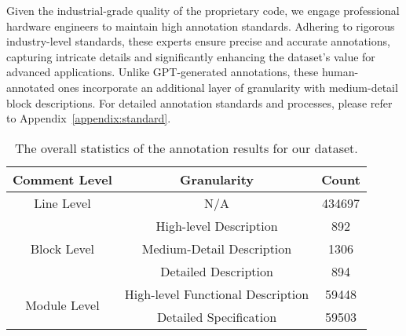 Given the industrial-grade quality of the proprietary code, we engage professional hardware engineers to maintain high annotation standards. Adhering to rigorous industry-level standards, these experts ensure precise and accurate annotations, capturing intricate details and significantly enhancing the dataset's value for advanced applications.
Unlike GPT-generated annotations, these human-annotated ones incorporate an additional layer of granularity with medium-detail block descriptions.
For detailed annotation standards and processes, please refer to Appendix~\ref{appendix:standard}.


\begin{table}[ht]
\centering
\vspace{-10pt}
\caption{The overall statistics of the annotation results for our dataset.}
\vspace{5pt}
\begin{tabular}{|c|c|c|}
\hline
\textbf{Comment Level} & \textbf{Granularity} & \textbf{Count} \\ \hline
Line Level             & N/A                  & 434697 \\ \hline
\multirow{3}{*}{Block Level}  & High-level Description    & 892    \\ \cline{2-3} 
                              & Medium-Detail Description & 1306    \\ \cline{2-3} 
                              & Detailed Description      & 894    \\ \hline
\multirow{2}{*}{Module Level} & High-level Functional Description    & 59448 \\ \cline{2-3} 
                              & Detailed Specification             & 59503 \\ \hline
\end{tabular}

\label{tab:dataset_statistics}
\end{table}


